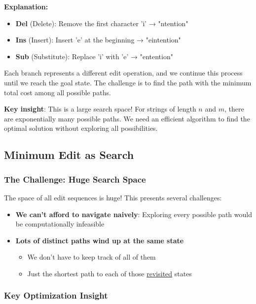 \documentclass[11pt,a4paper]{article}
\theoremstyle{definition}
\theoremstyle{plain}
\theoremstyle{remark}
\begin{document}
\textbf{Explanation:}
\begin{itemize}
    \item \textbf{Del} (Delete): Remove the first character 'i' → "ntention"
    \item \textbf{Ins} (Insert): Insert 'e' at the beginning → "eintention"
    \item \textbf{Sub} (Substitute): Replace 'i' with 'e' → "entention"
\end{itemize}

Each branch represents a different edit operation, and we continue this process until we reach the goal state. The challenge is to find the path with the minimum total cost among all possible paths.

\textbf{Key insight}: This is a large search space! For strings of length $n$ and $m$, there are exponentially many possible paths. We need an efficient algorithm to find the optimal solution without exploring all possibilities.

\subsection{Minimum Edit as Search}

\subsubsection{The Challenge: Huge Search Space}

The space of all edit sequences is huge! This presents several challenges:

\begin{itemize}
    \item \textbf{We can't afford to navigate naively}: Exploring every possible path would be computationally infeasible
    
    \item \textbf{Lots of distinct paths wind up at the same state}
    \begin{itemize}
        \item We don't have to keep track of all of them
        \item Just the shortest path to each of those \underline{revisited} states
    \end{itemize}
\end{itemize}

\subsubsection{Key Optimization Insight}
\end{document}
